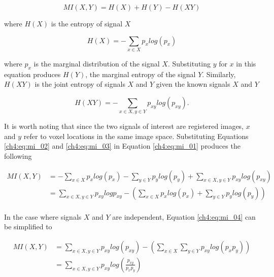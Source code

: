 \begin{equation}
\label{ch4:eq:mi_01}
MI(X, Y) = H(X) + H(Y) - H(XY)
\end{equation}

\noindent where $H(X)$ is the entropy of signal $X$

\begin{equation}
\label{ch4:eq:mi_02}
H(X) = - \sum_{x \in X} p_x log(p_x) 
\end{equation}

\noindent where $p_x$ is the marginal distribution of the signal $X$. Substituting $y$ for $x$ in this equation produces $H(Y)$, the marginal entropy of the signal $Y$. Similarly, $H(XY)$ is the joint entropy of signals $X$ and $Y$ given the known signals $X$ and $Y$

\begin{equation}
\label{ch4:eq:mi_03}
H(XY) = - \sum_{x \in X, y \in Y} p_{xy} log (p_{xy}).
\end{equation}

It is worth noting that since the two signals of interest are registered images, $x$ and $y$ refer to voxel locations in the same image space. Substituting Equations \ref{ch4:eq:mi_02} and \ref{ch4:eq:mi_03} in Equation \ref{ch4:eq:mi_01} produces the following

\begin{equation}
\label{ch4:eq:mi_04}
\begin{split}
MI(X, Y) & = - \sum_{x \in X} p_x log(p_x) - \sum_{y \in Y} p_y log(p_y) + \sum_{x \in X, y \in Y} p_{xy} log (p_{xy}) \\
 & = \sum_{x \in X, y \in Y} p_{xy} log p_{xy} - \left( \sum_{x \in X} p_x log(p_x) + \sum_{y \in Y} p_y log(p_y) \right) \\
\end{split}
\end{equation}

\noindent In the case where signals $X$ and $Y$ are independent, Equation \ref{ch4:eq:mi_04} can be simplified to

\begin{equation}
\label{ch4:eq:mi_05}
\begin{split}
MI(X, Y) & = \sum_{x \in X, y \in Y} p_{xy} log (p_{xy}) - \left( \sum_{x \in X} \sum_{y \in Y} p_{xy} log(p_x p_y) \right) \\
 & = \sum_{x \in X, y \in Y} p_{xy} log \left( \frac{p_{xy}}{p_x p_y} \right) \\
\end{split}
\end{equation} 

